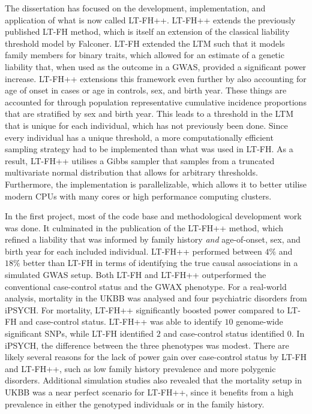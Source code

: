 The dissertation has focused on the development, implementation, and application of what is now called LT-FH++. LT-FH++ extends the previously published LT-FH method, which is itself an extension of the classical liability threshold model by Falconer. LT-FH extended the LTM such that it models family members for binary traits, which allowed for an estimate of a genetic liability that, when used as the outcome in a GWAS, provided a significant power increase. LT-FH++ extensions this framework even further by also accounting for age of onset in cases or age in controls, sex, and birth year. These things are accounted for through population representative cumulative incidence proportions that are stratified by sex and birth year. This leads to a threshold in the LTM that is unique for each individual, which has not previously been done. Since every individual has a unique threshold, a more computationally efficient sampling strategy had to be implemented than what was used in LT-FH. As a result, LT-FH++ utilises a Gibbs sampler that samples from a truncated multivariate normal distribution that allows for arbitrary thresholds. Furthermore, the implementation is parallelizable, which allows it to better utilise modern CPUs with many cores or high performance computing clusters.

In the first project, most of the code base and methodological development work was done. It culminated in the publication of the LT-FH++ method, which refined a liability that was informed by family history \textit{and} age-of-onset, sex, and birth year for each included individual. LT-FH++ performed between $ 4\% $ and $ 18\% $ better than LT-FH in terms of identifying the true causal associations in a simulated GWAS setup. Both LT-FH and LT-FH++ outperformed the conventional case-control status and the GWAX phenotype. For a real-world analysis, mortality in the UKBB was analysed and four psychiatric disorders from iPSYCH. For mortality, LT-FH++ significantly boosted power compared to LT-FH and case-control status. LT-FH++ was able to identify $ 10 $ genome-wide significant SNPs, while LT-FH identified $ 2 $ and case-control status identified $ 0 $. In iPSYCH, the difference between the three phenotypes was modest. There are likely several reasons for the lack of power gain over case-control status by LT-FH and LT-FH++, such as low family history prevalence and more polygenic disorders. Additional simulation studies also revealed that the mortality setup in UKBB was a near perfect scenario for LT-FH++, since it benefits from a high prevalence in either the genotyped individuals or in the family history.

